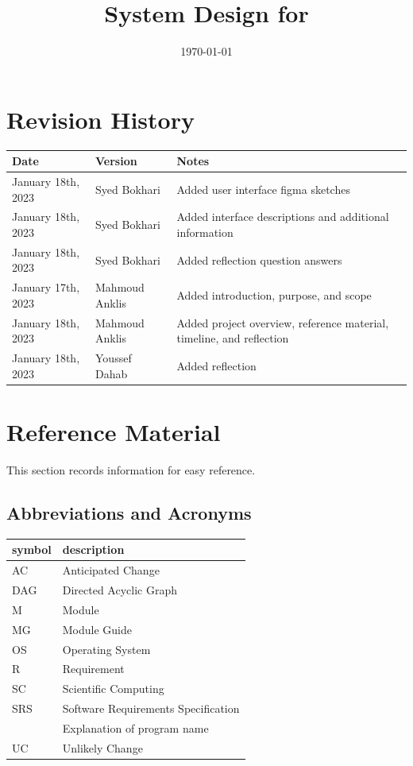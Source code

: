 \documentclass[12pt, titlepage]{article}
\begin{document}
\title{System Design for \progname{}} 
\author{\authname}
\date{\today}

\maketitle


\section{Revision History}

\begin{tabularx}{\textwidth}{p{3cm}p{2cm}X}
	\toprule {\bf Date} & {\bf Version} & {\bf Notes}\\
	\midrule
	January 18th, 2023 & Syed Bokhari & Added user interface figma sketches\\
	January 18th, 2023 & Syed Bokhari & Added interface descriptions and additional information\\
	January 18th, 2023 & Syed Bokhari & Added reflection question answers\\
	January 17th, 2023 & Mahmoud Anklis & Added introduction, purpose, and scope\\
	January 18th, 2023 & Mahmoud Anklis & Added project overview, reference material, timeline, and reflection\\
	January 18th, 2023 & Youssef Dahab & Added reflection\\
	\bottomrule
\end{tabularx}

\newpage

\section{Reference Material}

This section records information for easy reference.

\subsection{Abbreviations and Acronyms}

\renewcommand{\arraystretch}{1.2}
\begin{tabular}{l l} 
	\toprule		
	\textbf{symbol} & \textbf{description}\\
	\midrule 
	AC & Anticipated Change\\
	DAG & Directed Acyclic Graph \\
	M & Module \\
	MG & Module Guide \\
	OS & Operating System \\
	R & Requirement\\
	SC & Scientific Computing \\
	SRS & Software Requirements Specification\\
	\progname & Explanation of program name\\
	UC & Unlikely Change \\
	\bottomrule
\end{tabular}\\
\end{document}
